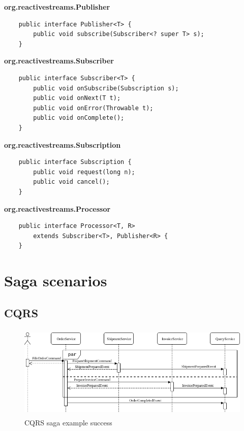 \documentclass[oneside,
  digital, %
  table,   %
  lof,     %
  lot,     %
]{fithesis3}
\begin{document}
\noindent
\textbf{org.reactivestreams.Publisher}

\begin{verbatim}
    public interface Publisher<T> {
        public void subscribe(Subscriber<? super T> s);
    }
\end{verbatim}

\noindent
\textbf{org.reactivestreams.Subscriber}

\begin{verbatim}
    public interface Subscriber<T> {
        public void onSubscribe(Subscription s);
        public void onNext(T t);
        public void onError(Throwable t);
        public void onComplete();
    }
\end{verbatim}

\noindent
\textbf{org.reactivestreams.Subscription}

\begin{verbatim}
    public interface Subscription {
        public void request(long n);
        public void cancel();
    }
\end{verbatim}

\noindent
\textbf{org.reactivestreams.Processor}

\begin{verbatim}
    public interface Processor<T, R> 
        extends Subscriber<T>, Publisher<R> {
    }
\end{verbatim}


\clearpage
\chapter{Saga scenarios}
\label{sec:appendix-scenarios}

\section{CQRS}

\begin{figure}[h]
    \begin{center}
        \includegraphics[height=45mm]{images/sequence/validSagaCQRS.png}
    \end{center}
    \caption{CQRS saga example success}
\end{figure}
\end{document}
